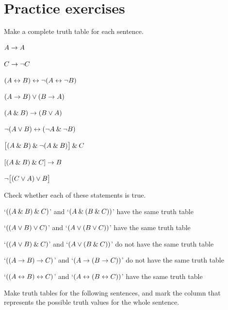
\section{Practice exercises}\label{pr.TT.TTorC}
\setcounter{ProbPart}{0}

\problempart
Make a complete truth table for each sentence.
\begin{earg}
\item $A \rightarrow A$ %
\item $C \rightarrow{\neg} C$ %
\item $(A \leftrightarrow B) \leftrightarrow {\neg}(A\leftrightarrow {\neg} B)$ %
\item $(A \rightarrow B) \vee (B \rightarrow A)$ %
\item $(A \mathbin{\&} B) \rightarrow (B \vee A)$  %
\item ${\neg}(A \vee B) \leftrightarrow ({\neg} A \mathbin{\&} {\neg} B)$ %
\item $\bigl[(A\mathbin{\&} B) \mathbin{\&}{\neg}(A\mathbin{\&} B)\bigr] \mathbin{\&} C$ %
\item $[(A \mathbin{\&} B) \mathbin{\&} C] \rightarrow B$ %
\item ${\neg}\bigl[(C\vee A) \vee B\bigr]$ %
\end{earg}

\problempart
Check whether each of these statements is true.
\begin{earg}
	\item `$((A \mathbin{\&} B) \mathbin{\&} C)$' and `$(A \mathbin{\&} (B \mathbin{\&} C))$' have the same truth table
	\item `$((A \vee B) \vee C)$' and `$(A \vee (B \vee C))$' have the same truth table
	\item `$((A \vee B) \mathbin{\&} C)$' and `$(A \vee (B \mathbin{\&} C))$' do not have the same truth table
	\item `$((A \rightarrow B) \rightarrow C)$' and `$(A \rightarrow (B \rightarrow C))$' do not have the same truth table
	\item `$((A \leftrightarrow B) \leftrightarrow C)$' and `$(A \leftrightarrow (B \leftrightarrow C))$' have the same truth table
\end{earg}

\problempart
Make truth tables for the following sentences, and mark the column that represents the possible truth values for the whole sentence.

